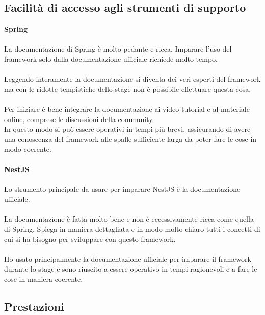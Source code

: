 \subsection{Facilità di accesso agli strumenti di supporto}
\textbf{Spring}
\\\\
La documentazione di Spring è molto pedante e ricca. Imparare l'uso del framework solo dalla documentazione 
ufficiale richiede molto tempo. 
\\\\
Leggendo interamente la documentazione si diventa dei veri esperti del framework ma con le ridotte tempistiche
dello stage non è possibile effettuare questa cosa.
\\\\
Per iniziare è bene integrare la documentazione ai video tutorial e al materiale online, comprese le discussioni 
della community. 
\\
In questo modo si può essere operativi in tempi più brevi, assicurando di avere una conoscenza
del framework alle spalle sufficiente larga da poter fare le cose in modo coerente.
\\\\
\textbf{NestJS}
\\\\
Lo strumento principale da usare per imparare NestJS è la documentazione ufficiale.
\\\\
La documentazione è fatta molto bene e non è eccessivamente ricca come quella di Spring. Spiega in maniera dettagliata
e in modo molto chiaro tutti i concetti di cui si ha bisogno per sviluppare con questo framework.
\\\\
Ho usato principalmente la documentazione ufficiale per imparare il framework durante lo stage e sono riuscito a essere
operativo in tempi ragionevoli e a fare le cose in maniera coerente.

\subsection{Prestazioni}
